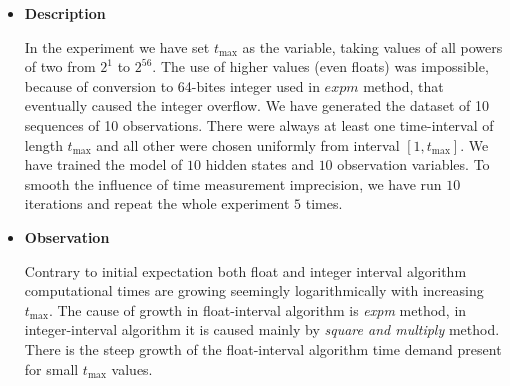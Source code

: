 \documentclass[thesis=M,english]{FITthesis}[2012/10/20]
\begin{document}
\begin{itemize}
\item \textbf{ Description }

In the experiment we have set $t_{\max}$ as the variable, taking values of all powers of two from $2^1$ to $2^{56}$. The use of higher values (even floats) was impossible, because of conversion to 64-bites integer used in $expm$ method, that eventually caused the integer overflow. We have generated the dataset of 10 sequences of 10 observations. There were always at least one time-interval of length $t_{\max}$ and all other were chosen uniformly from interval $[1,t_{\max}]$. We have trained the model of $10$ hidden states and $10$ observation variables. To smooth the influence of time measurement imprecision, we have run $10$ iterations and repeat the whole experiment $5$ times.   

\item \textbf{ Observation }

Contrary to initial expectation both float and integer interval algorithm computational times are growing seemingly logarithmically with increasing $t_{\max}$. The cause of growth in float-interval algorithm is \textit{expm} method, in integer-interval algorithm it is caused mainly by \textit{square and multiply} method. There is the steep growth of the float-interval algorithm time demand present for small $t_{\max}$ values.


\end{itemize}
\end{document}
